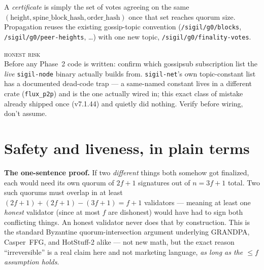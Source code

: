 \documentclass[10pt,a4paper]{article}
\newcommand{\warnbox}[1]{%
\begin{tcolorbox}[enhanced,
  interior style={left color=warn!8,right color=white},
  colframe=warn!55!slate,boxrule=0.5pt,arc=3pt,
  borderline west={2.5pt}{0pt}{warn},
  left=9pt,right=9pt,top=7pt,bottom=7pt]
{\scriptsize\textcolor{warn}{\textsc{honest risk}}}\\[3pt]
\small #1
\end{tcolorbox}}
\begin{document}
A \emph{certificate} is simply the set of votes agreeing on the same
$(\text{height}, \text{spine\_block\_hash}, \text{order\_hash})$ once that set reaches quorum size.
Propagation reuses the existing gossip-topic convention (\texttt{/sigil/g0/blocks},
\texttt{/sigil/g0/peer-heights}, \ldots) with one new topic, \texttt{/sigil/g0/finality-votes}.

\warnbox{Before any Phase~2 code is written: confirm which gossipsub subscription list the \emph{live}
\texttt{sigil-node} binary actually builds from. \texttt{sigil-net}'s own topic-constant list has a
documented dead-code trap — a same-named constant lives in a different crate (\texttt{flux\_p2p}) and is
the one actually wired in; this exact class of mistake already shipped once (v7.1.44) and quietly did
nothing. Verify before wiring, don't assume.}

\section{Safety and liveness, in plain terms}

\textbf{The one-sentence proof.} If two \emph{different} things both somehow got finalized, each would
need its own quorum of $2f{+}1$ signatures out of $n = 3f{+}1$ total. Two such quorums must overlap in
at least $(2f{+}1)+(2f{+}1)-(3f{+}1) = f{+}1$ validators — meaning at least one \emph{honest} validator
(since at most $f$ are dishonest) would have had to sign both conflicting things. An honest validator
never does that by construction. This is the standard Byzantine quorum-intersection argument underlying
GRANDPA, Casper~FFG, and HotStuff-2 alike — not new math, but the exact reason ``irreversible'' is a real
claim here and not marketing language, \emph{as long as the $\leq f$ assumption holds}.
\end{document}

